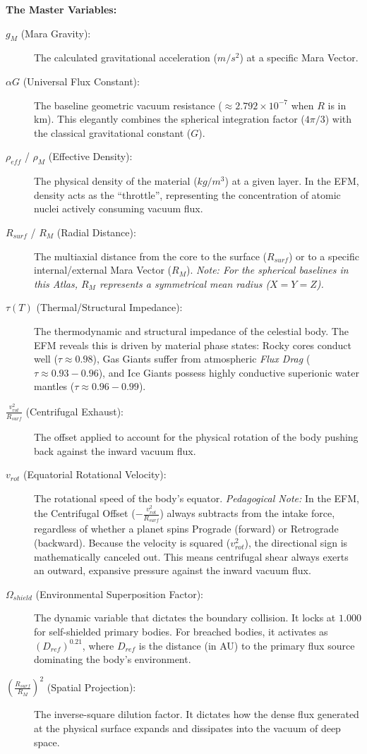 \documentclass[11pt, a4paper]{article}
\begin{document}
\vspace{0.5em}
\noindent \textbf{The Master Variables:}
\begin{description}
  \item[$g_M$ (Mara Gravity):] The calculated gravitational acceleration ($m/s^2$) at a specific Mara Vector. 
  \item[$\alpha G$ (Universal Flux Constant):] The baseline geometric vacuum resistance ($\approx 2.792 \times 10^{-7}$ when $R$ is in km). This elegantly combines the spherical integration factor ($4\pi/3$) with the classical gravitational constant ($G$).
  \item[$\rho_{eff}$ / $\rho_M$ (Effective Density):] The physical density of the material ($kg/m^3$) at a given layer. In the EFM, density acts as the ``throttle'', representing the concentration of atomic nuclei actively consuming vacuum flux.
  \item[$R_{surf}$ / $R_M$ (Radial Distance):] The multiaxial distance from the core to the surface ($R_{surf}$) or to a specific internal/external Mara Vector ($R_M$). \textit{Note: For the spherical baselines in this Atlas, $R_M$ represents a symmetrical mean radius ($X=Y=Z$).}
  \item[$\tau(T)$ (Thermal/Structural Impedance):] The thermodynamic and structural impedance of the celestial body. The EFM reveals this is driven by material phase states: Rocky cores conduct well ($\tau \approx 0.98$), Gas Giants suffer from atmospheric \textit{Flux Drag} ($\tau \approx 0.93 - 0.96$), and Ice Giants possess highly conductive superionic water mantles ($\tau \approx 0.96 - 0.99$).
  \item[$\frac{v_{rot}^2}{R_{surf}}$ (Centrifugal Exhaust):] The offset applied to account for the physical rotation of the body pushing back against the inward vacuum flux.
  \item[$v_{rot}$ (Equatorial Rotational Velocity):] The rotational speed of the body's equator. \textit{Pedagogical Note:} In the EFM, the Centrifugal Offset ($-\frac{v_{rot}^2}{R_{surf}}$) always subtracts from the intake force, regardless of whether a planet spins Prograde (forward) or Retrograde (backward). Because the velocity is squared ($v_{rot}^2$), the directional sign is mathematically canceled out. This means centrifugal shear always exerts an outward, expansive pressure against the inward vacuum flux.
  \item[$\Omega_{shield}$ (Environmental Superposition Factor):] The dynamic variable that dictates the boundary collision. It locks at $1.000$ for self-shielded primary bodies. For breached bodies, it activates as $(D_{ref})^{0.21}$, where $D_{ref}$ is the distance (in AU) to the primary flux source dominating the body's environment.
  \item[$\left( \frac{R_{surf}}{R_M} \right)^2$ (Spatial Projection):] The inverse-square dilution factor. It dictates how the dense flux generated at the physical surface expands and dissipates into the vacuum of deep space.
\end{description}
\end{document}
